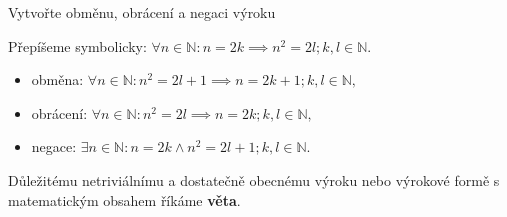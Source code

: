 \begin{priklad}
    Vytvořte obměnu, obrácení a negaci výroku
    \begin{center}
    \end{center}
\end{priklad}

\begin{reseni}
Přepíšeme symbolicky: $\forall n \in \mathbb N\colon n=2k \implies n^2=2l; k,l \in \mathbb N.$
\begin{itemize}
\item obměna: $\forall n \in \mathbb N\colon n^2=2l+1 \implies n=2k+1; k,l \in \mathbb N,$
\item obrácení: $\forall n \in \mathbb N\colon n^2=2l \implies n=2k; k,l \in \mathbb N,$
\item negace: $\exists n \in \mathbb N\colon n=2k\land n^2 = 2l+1; k,l\in \mathbb N.$
\end{itemize}
\end{reseni}

\begin{pozn}
  Důležitému netriviálnímu a dostatečně obecnému výroku nebo výrokové formě s matematickým obsahem říkáme \textbf{věta}.
\end{pozn}

